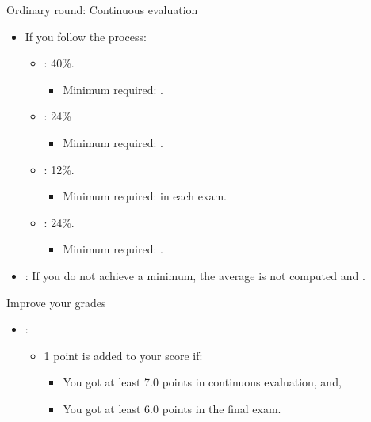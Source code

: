 \begin{frame}[t]{Ordinary round: Continuous evaluation}
\begin{itemize}
  \item If you follow the  process:
    \begin{itemize}
      \item {}: 40\%.
        \begin{itemize}
          \item Minimum required: .
        \end{itemize}
      \item {}: 24\%
        \begin{itemize}
          \item Minimum required: .
        \end{itemize}
      \item {}: 12\%.
        \begin{itemize}
          \item Minimum required:  in each exam.
        \end{itemize}
      \item {}: 24\%.
        \begin{itemize}
          \item Minimum required: .
        \end{itemize}
    \end{itemize}

    \item {}: If you do not achieve a minimum, the average is not computed and 
        .
\end{itemize}
\end{frame}

\begin{frame}[t]{Improve your grades}
\begin{itemize}
  \item {}:
    \begin{itemize}
      \item 1 point is added to your score if:
        \begin{itemize}
          \item You got at least 7.0 points in continuous evaluation, and,
          \item You got at least 6.0 points in the final exam.
        \end{itemize}
    \end{itemize}
\end{itemize}
\end{frame}

